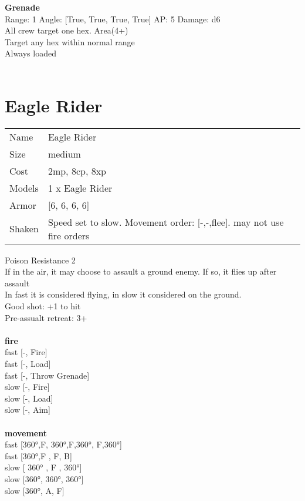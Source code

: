{\bf Grenade } \\



Range: 1  Angle: [True, True, True, True] AP: 5 Damage: d6 \\
All crew target one hex. Area(4+)\\ 
Target any hex within normal range\\ 
Always loaded\\ 




 
\ \\













\clearpage

\section{ Eagle Rider }

\begin{tabular}{ll}
  Name & Eagle Rider \\
  Size & medium\\
  Cost & 2mp, 8cp, 8xp\\
  Models & 1 x Eagle Rider\\
  Armor & [6, 6, 6, 6]\\
  Shaken & Speed set to slow. Movement order: [-,-,flee]. may not use fire orders\\
\end{tabular}

\noindent Poison Resistance 2\\ 
If in the air, it may choose to assault a ground enemy. If so, it flies up after assault\\ 
In fast it is considered flying, in slow it considered on the ground.\\ 
Good shot: +1 to hit\\ 
Pre-assualt retreat: 3+\\ 


\ \\ {\bf fire } \\
fast [-, Fire] \\
fast [-, Load] \\
fast [-, Throw Grenade] \\
slow [-, Fire] \\
slow [-, Load] \\
slow [-, Aim] \\
\ \\ {\bf movement } \\
fast [360°,F, 360°,F,360°, F,360°] \\
fast [360°,F , F, B] \\
slow [ 360° ,  F ,  360°] \\
slow [360°, 360°, 360°] \\
slow [360°, A, F] \\


